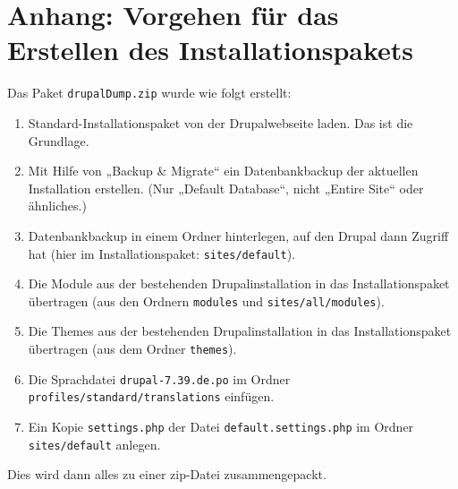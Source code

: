 \documentclass[a4paper,11pt,twoside]{article}
\begin{document}
\section{Anhang: Vorgehen für das Erstellen des Installationspakets}

Das Paket \texttt{drupalDump.zip} wurde wie folgt erstellt: 

\begin{enumerate}\itemsep0pt
\item Standard-Installationspaket von der Drupalwebseite laden. Das ist die
  Grundlage.
\item Mit Hilfe von „Backup \& Migrate“ ein Datenbankbackup der aktuellen
  Installation erstellen. (Nur „Default Database“, nicht „Entire Site“ oder
  ähnliches.)
\item Datenbankbackup in einem Ordner hinterlegen, auf den Drupal dann Zugriff
  hat (hier im Installationspaket: \texttt{sites/default}).
\item Die Module aus der bestehenden Drupalinstallation in das
  Installationspaket übertragen (aus den Ordnern \texttt{modules} und
  \texttt{sites/all/modules}).
\item Die Themes aus der bestehenden Drupalinstallation in das
  Installationspaket übertragen (aus dem Ordner \texttt{themes}).
\item Die Sprachdatei \texttt{drupal-7.39.de.po} im Ordner
  \texttt{profiles/standard/translations} einfügen.
\item Ein Kopie \texttt{settings.php} der Datei \texttt{default.settings.php}
  im Ordner \texttt{sites/default} anlegen.
\end{enumerate}
Dies wird dann alles zu einer zip-Datei zusammengepackt.
\end{document}

